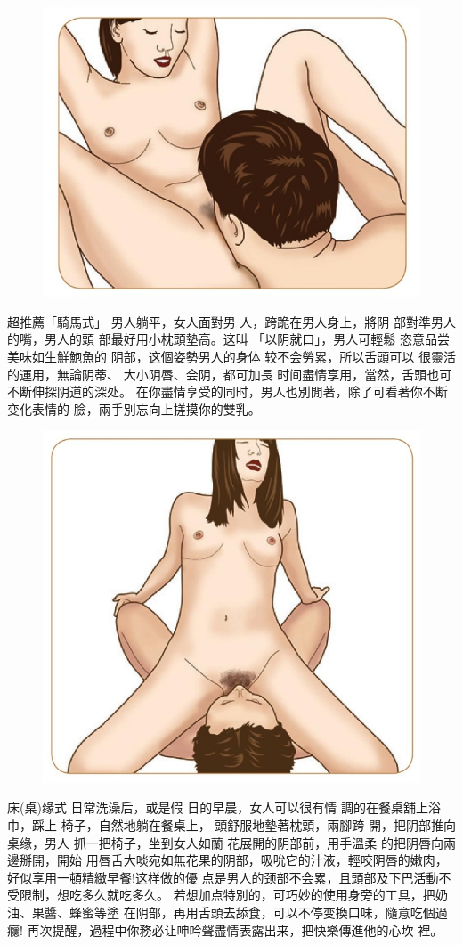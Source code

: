 \documentclass[12pt,UTF8]{ctexbook}
\begin{document}
\begin{figure}[htbp]
	\centering
	\includegraphics[width=0.7\linewidth]{21}
	\caption{}
	\label{fig:1}
\end{figure}

超推薦「騎馬式」
男人躺平，女人面對男
人，跨跪在男人身上，將阴
部對準男人的嘴，男人的頭
部最好用小枕頭墊高。这叫
「以阴就口」，男人可輕鬆
恣意品尝美味如生鮮鮑魚的
阴部，这個姿勢男人的身体
较不会勞累，所以舌頭可以
很靈活的運用，無論阴蒂、
大小阴唇、会阴，都可加長
时间盡情享用，當然，舌頭也可不断伸探阴道的深处。
在你盡情享受的同时，男人也別閒著，除了可看著你不断变化表情的
臉，兩手別忘向上搓摸你的雙乳。

\begin{figure}[htbp]
	\centering
	\includegraphics[width=0.7\linewidth]{22}
	\caption{}
	\label{fig:1}
\end{figure}

床(桌)缘式
日常洗澡后，或是假
日的早晨，女人可以很有情
調的在餐桌舖上浴巾，踩上
椅子，自然地躺在餐桌上，
頭舒服地墊著枕頭，兩腳跨
開，把阴部推向桌缘，男人
抓一把椅子，坐到女人如蘭
花展開的阴部前，用手溫柔
的把阴唇向兩邊掰開，開始
用唇舌大啖宛如無花果的阴部，吸吮它的汁液，輕咬阴唇的嫩肉，好似享用一頓精緻早餐!这样做的優
点是男人的颈部不会累，且頭部及下巴活動不受限制，想吃多久就吃多久。
若想加点特別的，可巧妙的使用身旁的工具，把奶油、果醬、蜂蜜等塗
在阴部，再用舌頭去舔食，可以不停变換口味，隨意吃個過癮!
再次提醒，過程中你務必让呻吟聲盡情表露出来，把快樂傳進他的心坎
裡。
\end{document}
